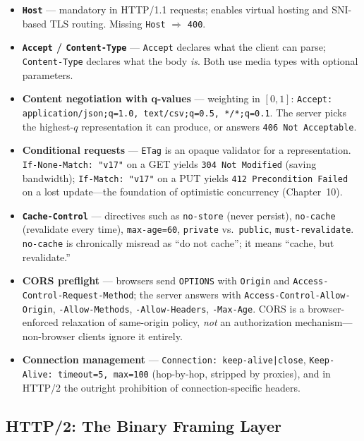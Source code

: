 \begin{itemize}
  \item \textbf{\texttt{Host}} --- mandatory in HTTP/1.1 requests; enables virtual hosting and SNI-based TLS routing. Missing \texttt{Host} $\Rightarrow$ \texttt{400}.
  \item \textbf{\texttt{Accept} / \texttt{Content-Type}} --- \texttt{Accept} declares what the client can parse; \texttt{Content-Type} declares what the body \emph{is}. Both use media types with optional parameters.
  \item \textbf{Content negotiation with q-values} --- weighting in $[0,1]$: \texttt{Accept: application/json;q=1.0, text/csv;q=0.5, */*;q=0.1}. The server picks the highest-$q$ representation it can produce, or answers \texttt{406 Not Acceptable}.
  \item \textbf{Conditional requests} --- \texttt{ETag} is an opaque validator for a representation. \texttt{If-None-Match: "v17"} on a GET yields \texttt{304 Not Modified} (saving bandwidth); \texttt{If-Match: "v17"} on a PUT yields \texttt{412 Precondition Failed} on a lost update---the foundation of optimistic concurrency (Chapter~10).
  \item \textbf{\texttt{Cache-Control}} --- directives such as \texttt{no-store} (never persist), \texttt{no-cache} (revalidate every time), \texttt{max-age=60}, \texttt{private} vs.\ \texttt{public}, \texttt{must-revalidate}. \texttt{no-cache} is chronically misread as ``do not cache''; it means ``cache, but revalidate.''
  \item \textbf{CORS preflight} --- browsers send \texttt{OPTIONS} with \texttt{Origin} and \texttt{Access-Control-Request-Method}; the server answers with \texttt{Access-Control-Allow-Origin}, \texttt{-Allow-Methods}, \texttt{-Allow-Headers}, \texttt{-Max-Age}. CORS is a browser-enforced relaxation of same-origin policy, \emph{not} an authorization mechanism---non-browser clients ignore it entirely.
  \item \textbf{Connection management} --- \texttt{Connection: keep-alive|close}, \texttt{Keep-Alive: timeout=5, max=100} (hop-by-hop, stripped by proxies), and in HTTP/2 the outright prohibition of connection-specific headers.
\end{itemize}

\subsection{HTTP/2: The Binary Framing Layer}

